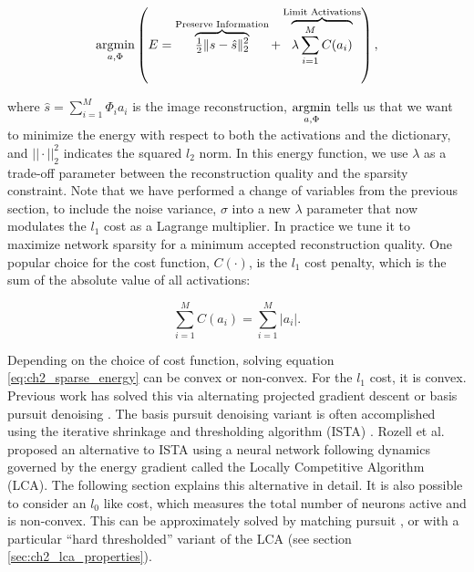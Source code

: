 \begin{equation}\label{eq:ch2_sparse_energy}
    \argmin\limits_{a, \Phi}
        \left( E =
            \overbrace{ \tfrac{1}{2} \| s - \hat{s} \|_{2}^{2} }^\text{Preserve Information} +
        \overbrace{ \lambda \sum\limits_{i=1}^{M}C(a_{i}) }^\text{Limit Activations} \right),
\end{equation}

\noindent where $\hat{s} = \sum\limits_{i=1}^{M}\Phi_{i}a_{i}$ is the image reconstruction, $\argmin\limits_{a, \Phi}$ tells us that we want to minimize the energy with respect to both the activations and the dictionary, and $||\cdot||_2^2$ indicates the squared $l_2$ norm. In this energy function, we use $\lambda$ as a trade-off parameter between the reconstruction quality and the sparsity constraint. Note that we have performed a change of variables from the previous section, to include the noise variance, $\sigma$ into a new $\lambda$ parameter that now modulates the $l_{1}$ cost as a Lagrange multiplier. In practice we tune it to maximize network sparsity for a minimum accepted reconstruction quality. One popular choice for the cost function, $C(\cdot)$, is the $l_{1}$ cost penalty, which is the sum of the absolute value of all activations:

\begin{equation}\label{eq:ch2_l1_cost}
  \sum\limits_{i=1}^{M}C(a_{i}) = \sum\limits_{i=1}^{M}|a_{i}|.
\end{equation}

Depending on the choice of cost function, solving equation \eqref{eq:ch2_sparse_energy} can be convex or non-convex. For the $l_{1}$ cost, it is convex. Previous work has solved this via alternating projected gradient descent \parencite{olshausen1997sparse} or basis pursuit denoising \parencite{chen2001atomic}. The basis pursuit denoising variant is often accomplished using the iterative shrinkage and thresholding algorithm (ISTA) \parencite{daubechies2004iterative, beck2009fast}. Rozell et al. \citeyearpar{rozell2008sparse} proposed an alternative to ISTA using a neural network following dynamics governed by the energy gradient called the Locally Competitive Algorithm (LCA). The following section explains this alternative in detail. It is also possible to consider an $l_{0}$ like cost, which measures the total number of neurons active and is non-convex. This can be approximately solved by matching pursuit \parencite{davis1997adaptive, rehn2007network, rebollo2002optimized}, or with a particular ``hard thresholded'' variant of the LCA (see section \ref{sec:ch2_lca_properties}).


